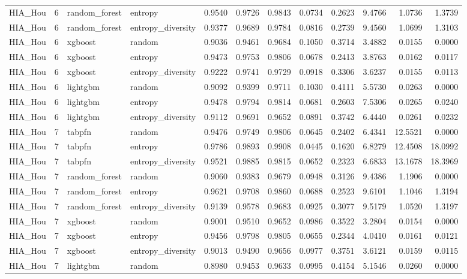 \begin{tabular}{lrllrrrrrrrr}
HIA_Hou & 6 & random_forest & entropy & 0.9540 & 0.9726 & 0.9843 & 0.0734 & 0.2623 & 9.4766 & 1.0736 & 1.3739 \\
HIA_Hou & 6 & random_forest & entropy_diversity & 0.9377 & 0.9689 & 0.9784 & 0.0816 & 0.2739 & 9.4560 & 1.0699 & 1.3103 \\
HIA_Hou & 6 & xgboost & random & 0.9036 & 0.9461 & 0.9684 & 0.1050 & 0.3714 & 3.4882 & 0.0155 & 0.0000 \\
HIA_Hou & 6 & xgboost & entropy & 0.9473 & 0.9753 & 0.9806 & 0.0678 & 0.2413 & 3.8763 & 0.0162 & 0.0117 \\
HIA_Hou & 6 & xgboost & entropy_diversity & 0.9222 & 0.9741 & 0.9729 & 0.0918 & 0.3306 & 3.6237 & 0.0155 & 0.0113 \\
HIA_Hou & 6 & lightgbm & random & 0.9092 & 0.9399 & 0.9711 & 0.1030 & 0.4111 & 5.5730 & 0.0263 & 0.0000 \\
HIA_Hou & 6 & lightgbm & entropy & 0.9478 & 0.9794 & 0.9814 & 0.0681 & 0.2603 & 7.5306 & 0.0265 & 0.0240 \\
HIA_Hou & 6 & lightgbm & entropy_diversity & 0.9112 & 0.9691 & 0.9652 & 0.0891 & 0.3742 & 6.4440 & 0.0261 & 0.0232 \\
HIA_Hou & 7 & tabpfn & random & 0.9476 & 0.9749 & 0.9806 & 0.0645 & 0.2402 & 6.4341 & 12.5521 & 0.0000 \\
HIA_Hou & 7 & tabpfn & entropy & 0.9786 & 0.9893 & 0.9908 & 0.0445 & 0.1620 & 6.8279 & 12.4508 & 18.0992 \\
HIA_Hou & 7 & tabpfn & entropy_diversity & 0.9521 & 0.9885 & 0.9815 & 0.0652 & 0.2323 & 6.6833 & 13.1678 & 18.3969 \\
HIA_Hou & 7 & random_forest & random & 0.9060 & 0.9383 & 0.9679 & 0.0948 & 0.3126 & 9.4386 & 1.1906 & 0.0000 \\
HIA_Hou & 7 & random_forest & entropy & 0.9621 & 0.9708 & 0.9860 & 0.0688 & 0.2523 & 9.6101 & 1.1046 & 1.3194 \\
HIA_Hou & 7 & random_forest & entropy_diversity & 0.9139 & 0.9578 & 0.9683 & 0.0925 & 0.3077 & 9.5179 & 1.0520 & 1.3197 \\
HIA_Hou & 7 & xgboost & random & 0.9001 & 0.9510 & 0.9652 & 0.0986 & 0.3522 & 3.2804 & 0.0154 & 0.0000 \\
HIA_Hou & 7 & xgboost & entropy & 0.9456 & 0.9798 & 0.9805 & 0.0655 & 0.2344 & 4.0410 & 0.0161 & 0.0121 \\
HIA_Hou & 7 & xgboost & entropy_diversity & 0.9013 & 0.9490 & 0.9656 & 0.0977 & 0.3751 & 3.6121 & 0.0159 & 0.0115 \\
HIA_Hou & 7 & lightgbm & random & 0.8980 & 0.9453 & 0.9633 & 0.0995 & 0.4154 & 5.1546 & 0.0260 & 0.0000 \\

\end{tabular}
